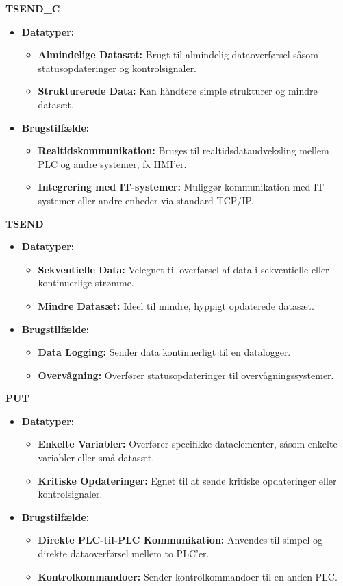 \noindent\textbf{TSEND\_C}
\begin{itemize}
	\item \textbf{Datatyper:}
	\begin{itemize}
		\item \textbf{Almindelige Datasæt:} Brugt til almindelig dataoverførsel såsom statusopdateringer og kontrolsignaler.
		\item \textbf{Strukturerede Data:} Kan håndtere simple strukturer og mindre datasæt.
	\end{itemize}
	\item \textbf{Brugstilfælde:}
	\begin{itemize}
		\item \textbf{Realtidskommunikation:} Bruges til realtidsdataudveksling mellem PLC og andre systemer, fx HMI'er.
		\item \textbf{Integrering med IT-systemer:} Muliggør kommunikation med IT-systemer eller andre enheder via standard TCP/IP.
	\end{itemize}
\end{itemize}

\noindent\textbf{TSEND}
\begin{itemize}
	\item \textbf{Datatyper:}
	\begin{itemize}
		\item \textbf{Sekventielle Data:} Velegnet til overførsel af data i sekventielle eller kontinuerlige strømme.
		\item \textbf{Mindre Datasæt:} Ideel til mindre, hyppigt opdaterede datasæt.
	\end{itemize}
	\item \textbf{Brugstilfælde:}
	\begin{itemize}
		\item \textbf{Data Logging:} Sender data kontinuerligt til en datalogger.
		\item \textbf{Overvågning:} Overfører statusopdateringer til overvågningssystemer.
	\end{itemize}
\end{itemize}

\noindent\textbf{PUT}
\begin{itemize}
	\item \textbf{Datatyper:}
	\begin{itemize}
		\item \textbf{Enkelte Variabler:} Overfører specifikke dataelementer, såsom enkelte variabler eller små datasæt.
		\item \textbf{Kritiske Opdateringer:} Egnet til at sende kritiske opdateringer eller kontrolsignaler.
	\end{itemize}
	\item \textbf{Brugstilfælde:}
	\begin{itemize}
		\item \textbf{Direkte PLC-til-PLC Kommunikation:} Anvendes til simpel og direkte dataoverførsel mellem to PLC'er.
		\item \textbf{Kontrolkommandoer:} Sender kontrolkommandoer til en anden PLC.
	\end{itemize}
\end{itemize}

